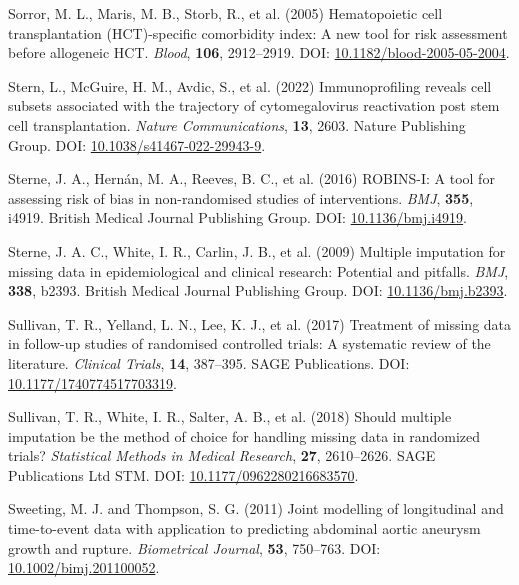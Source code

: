 \documentclass[
  letterpaper,
  paper=240mm:170mm,
  twoside=true,
  open=right,
  fontsize=10pt,
  pagesize=false,
  BCOR=15mm,
  DIV=14,
  headinclude=true,
  footinclude=false,
  headsepline=on]{scrbook}
\newlength{\cslhangindent}
\newenvironment{CSLReferences}[2] %
 {\begin{list}{}{%
  \setlength{\itemindent}{0pt}
  \setlength{\leftmargin}{0pt}
  \setlength{\parsep}{0pt}
  \ifodd #1
   \setlength{\leftmargin}{\cslhangindent}
   \setlength{\itemindent}{-1\cslhangindent}
  \fi
  \setlength{\itemsep}{#2\baselineskip}}}
 {\end{list}}
\begin{document}
\begin{CSLReferences}{1}{1}
Sorror, M. L., Maris, M. B., Storb, R., et al. (2005) Hematopoietic cell
transplantation ({HCT})-specific comorbidity index: A new tool for risk
assessment before allogeneic {HCT}. \emph{Blood}, \textbf{106},
2912--2919. DOI:
\href{https://doi.org/10.1182/blood-2005-05-2004}{10.1182/blood-2005-05-2004}.

Stern, L., McGuire, H. M., Avdic, S., et al. (2022) Immunoprofiling
reveals cell subsets associated with the trajectory of cytomegalovirus
reactivation post stem cell transplantation. \emph{Nature
Communications}, \textbf{13}, 2603. Nature Publishing Group. DOI:
\href{https://doi.org/10.1038/s41467-022-29943-9}{10.1038/s41467-022-29943-9}.

Sterne, J. A., Hernán, M. A., Reeves, B. C., et al. (2016) {ROBINS-I}: A
tool for assessing risk of bias in non-randomised studies of
interventions. \emph{BMJ}, \textbf{355}, i4919. British Medical Journal
Publishing Group. DOI:
\href{https://doi.org/10.1136/bmj.i4919}{10.1136/bmj.i4919}.

Sterne, J. A. C., White, I. R., Carlin, J. B., et al. (2009) Multiple
imputation for missing data in epidemiological and clinical research:
Potential and pitfalls. \emph{BMJ}, \textbf{338}, b2393. British Medical
Journal Publishing Group. DOI:
\href{https://doi.org/10.1136/bmj.b2393}{10.1136/bmj.b2393}.

Sullivan, T. R., Yelland, L. N., Lee, K. J., et al. (2017) Treatment of
missing data in follow-up studies of randomised controlled trials: {A}
systematic review of the literature. \emph{Clinical Trials},
\textbf{14}, 387--395. SAGE Publications. DOI:
\href{https://doi.org/10.1177/1740774517703319}{10.1177/1740774517703319}.

Sullivan, T. R., White, I. R., Salter, A. B., et al. (2018) Should
multiple imputation be the method of choice for handling missing data in
randomized trials? \emph{Statistical Methods in Medical Research},
\textbf{27}, 2610--2626. SAGE Publications Ltd STM. DOI:
\href{https://doi.org/10.1177/0962280216683570}{10.1177/0962280216683570}.

Sweeting, M. J. and Thompson, S. G. (2011) Joint modelling of
longitudinal and time-to-event data with application to predicting
abdominal aortic aneurysm growth and rupture. \emph{Biometrical
Journal}, \textbf{53}, 750--763. DOI:
\href{https://doi.org/10.1002/bimj.201100052}{10.1002/bimj.201100052}.


\end{CSLReferences}
\end{document}
